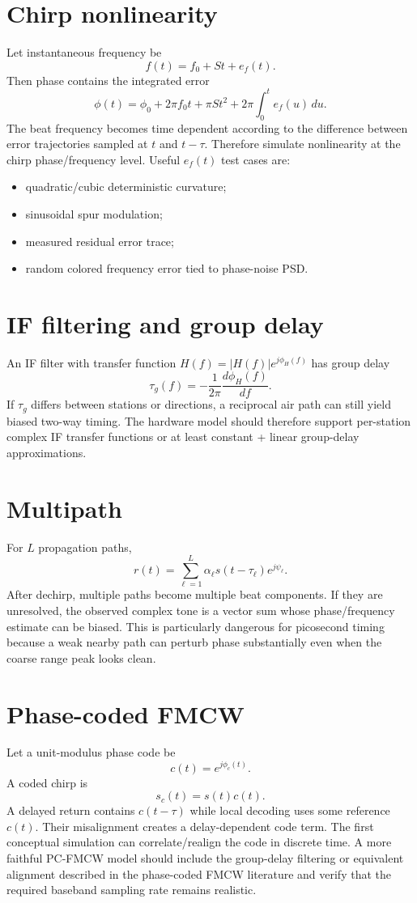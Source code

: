 \documentclass[11pt]{article}
\begin{document}
\section{Chirp nonlinearity}
Let instantaneous frequency be
\[
f(t)=f_0+St+e_f(t).
\]
Then phase contains the integrated error
\[
\phi(t)=\phi_0+2\pi f_0t+\pi St^2+2\pi\int_0^t e_f(u)\,du.
\]
The beat frequency becomes time dependent according to the difference between error trajectories sampled at $t$ and $t-\tau$. Therefore simulate nonlinearity at the chirp phase/frequency level. Useful $e_f(t)$ test cases are:
\begin{itemize}
\item quadratic/cubic deterministic curvature;
\item sinusoidal spur modulation;
\item measured residual error trace;
\item random colored frequency error tied to phase-noise PSD.
\end{itemize}

\section{IF filtering and group delay}
An IF filter with transfer function $H(f)=|H(f)|e^{j\phi_H(f)}$ has group delay
\[
\tau_g(f)=-\frac{1}{2\pi}\frac{d\phi_H(f)}{df}.
\]
If $\tau_g$ differs between stations or directions, a reciprocal air path can still yield biased two-way timing. The hardware model should therefore support per-station complex IF transfer functions or at least constant + linear group-delay approximations.

\section{Multipath}
For $L$ propagation paths,
\[
r(t)=\sum_{\ell=1}^{L}\alpha_\ell s(t-\tau_\ell)e^{j\psi_\ell}.
\]
After dechirp, multiple paths become multiple beat components. If they are unresolved, the observed complex tone is a vector sum whose phase/frequency estimate can be biased. This is particularly dangerous for picosecond timing because a weak nearby path can perturb phase substantially even when the coarse range peak looks clean.

\section{Phase-coded FMCW}
Let a unit-modulus phase code be
\[
c(t)=e^{j\phi_c(t)}.
\]
A coded chirp is
\[
s_c(t)=s(t)c(t).
\]
A delayed return contains $c(t-\tau)$ while local decoding uses some reference $c(t)$. Their misalignment creates a delay-dependent code term. The first conceptual simulation can correlate/realign the code in discrete time. A more faithful PC-FMCW model should include the group-delay filtering or equivalent alignment described in the phase-coded FMCW literature and verify that the required baseband sampling rate remains realistic.
\end{document}
